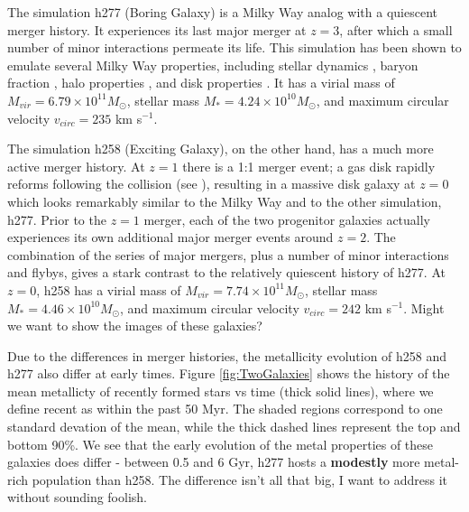 \documentclass[nofootinbib,twocolumn,prd]{emulateapj}
\newcommand\editremark[1]{{\color{red}#1}}
\newcommand\msun{M_\odot}
\begin{document}
The simulation h277 (Boring Galaxy) is a Milky Way analog with a
quiescent merger history.  It experiences its last major merger at $z
= 3$, after which a small number of minor interactions permeate its
life.  This simulation has been shown to emulate several Milky Way
properties, including stellar dynamics
\citep{2012ApJ...758L..23L,2014ApJ...794..151L,2014ApJ...790...89K}, baryon fraction
\citep{2013ApJ...766...56M}, halo properties \citep{2009ApJ...702.1058Z,2010ApJ...721..738Z}, and
disk properties \citep{2011ApJ...728...51B}.  It has a virial mass of $M_{vir} =
6.79 \times 10^{11} \msun$, stellar mass $M_* = 4.24 \times 10^{10}
\msun$, and maximum circular velocity $v_{circ} = 235$ km s$^{-1}$.

  The simulation h258 (Exciting Galaxy), on the other hand, has a much
  more active merger history.  At $z = 1$ there is a 1:1 merger event;
  a gas disk rapidly reforms following the collision (see
  \citet{2009MNRAS.398..312G}), resulting in a massive disk galaxy at $z = 0$
  which looks remarkably similar to the Milky Way and to the other
  simulation, h277.  Prior to the $z = 1$ merger, each of the two
  progenitor galaxies actually experiences its own additional major
  merger events around $z = 2$.  The combination of
  the series of major mergers, plus a number of minor interactions and
  flybys, gives a stark contrast to the relatively quiescent history
  of h277.  At $z = 0$, h258 has a virial mass of $M_{vir} = 7.74
  \times 10^{11} \msun$, stellar mass $M_* = 4.46 \times 10^{10}
  \msun$, and maximum circular velocity $v_{circ} = 242$ km s$^{-1}$.  \editremark{Might we want to show the images of these galaxies?}


  Due to the differences in merger histories, the metallicity
  evolution of h258 and h277 also differ at early times.  Figure
  \ref{fig:TwoGalaxies} shows the history of the mean metallicty of
  recently formed stars vs time (thick solid lines), where we define
  recent as within the past 50 Myr.  The shaded regions correspond to
  one standard devation of the mean, while the thick dashed lines
  represent the top and bottom 90\%.  We see that the early evolution
  of the metal properties of these galaxies does differ - between 0.5
  and 6 Gyr, h277 hosts a {\bf modestly} more metal-rich population than
  h258. \editremark{The difference isn't all that big, I want to address it without sounding foolish.}
\end{document}
